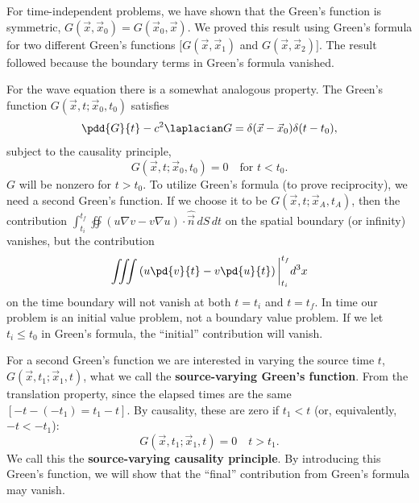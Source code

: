 For time-independent problems, we have shown that the Green's function is symmetric, $G(\vec{x},\vec{x}_0) = G(\vec{x}_0,\vec{x})$.  We proved this result using Green's formula for two different Green's functions $[G(\vec{x},\vec{x}_1)$ and $G(\vec{x},\vec{x}_2)]$.  The result followed because the boundary terms in Green's formula vanished.

For the wave equation there is a somewhat analogous property.  The Green's function $G(\vec{x},t;\vec{x}_0,t_0)$ satisfies
\begin{equation}
\label{eq:11.2.13}
\pdd{G}{t} - c^2\laplacian G = \delta(\vec{x} - \vec{x}_0)\delta(t - t_0),
\end{equation}
subject to the causality principle,
\begin{equation}
\label{eq:11.2.14}
G(\vec{x},t;\vec{x}_0,t_0) = 0 \quad \text{for } t < t_0.
\end{equation}
$G$ will be nonzero for $t > t_0$.  To utilize Green's formula (to prove reciprocity), we need a second Green's function.  If we choose it to be $G(\vec{x},t;\vec{x}_A,t_A)$, then the contribution $\int_{t_i}^{t_f} \oiint (u\nabla v - v\nabla u)\cdot\hat{\vec{n}}\,dS\,dt$ on the spatial boundary (or infinity) vanishes, but the contribution
\[
\iiint \left(u\pd{v}{t} - v\pd{u}{t}\right)\bigg|_{t_i}^{t_f} d^3x
\]
on the time boundary will not vanish at both $t = t_i$ and $t = t_f$.  In time our problem is an initial value problem, not a boundary value problem.  If we let $t_i \le t_0$ in Green's formula, the ``initial'' contribution will vanish.

For a second Green's function we are interested in varying the source time $t$, $G(\vec{x},t_1;\vec{x}_1,t)$, what we call the \textbf{source-varying Green's function}.  From the translation property,
since the elapsed times are the same $[-t-(-t_1) = t_1 - t]$.  By causality, these are zero if $t_1 < t$ (or, equivalently, $-t < -t_1$):
\begin{equation}
\label{eq:11.2.16}
G(\vec{x},t_1;\vec{x}_1,t) = 0 \quad t > t_1.
\end{equation}
We call this the \textbf{source-varying causality principle}.  By introducing this Green's function, we will show that the ``final'' contribution from Green's formula may vanish.

